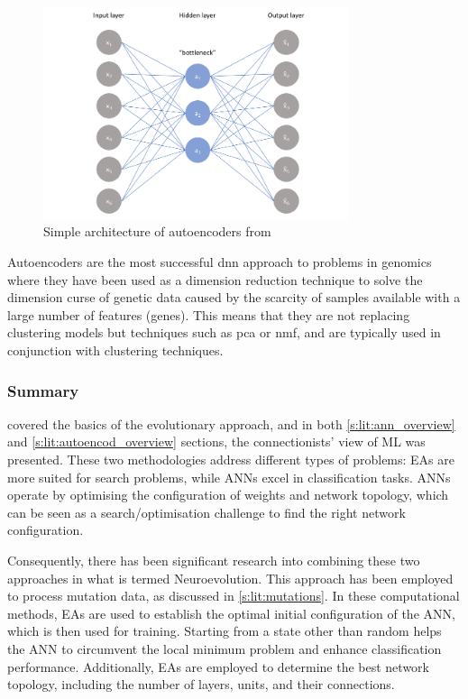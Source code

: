 \begin{figure}[!htb]
  \centering\includegraphics[width=0.8\textwidth,height=0.5\textheight,keepaspectratio]{Sections/Lit_review/Resources/simple_autoencoders.png}
    \caption{Simple architecture of autoencoders from \cite{Jordan2018-bc}}
    \label{fig:autoencoders}
\end{figure}
\FloatBarrier

Autoencoders are the most successful \acrshort{dnn} approach to problems in genomics where they have been used as a dimension reduction technique to solve the dimension curse of genetic data caused by the scarcity of samples available with a large number of features (genes). This means that they are not replacing clustering models but techniques such as \acrfull{pca} or \acrfull{nmf}, and are typically used in conjunction with clustering techniques.


\subsubsection{Summary} \label{s:lit:choosing_ml}

 covered the basics of the evolutionary approach, and in both \ref{s:lit:ann_overview} and \ref{s:lit:autoencod_overview} sections, the connectionists' view of ML was presented. These two methodologies address different types of problems: EAs are more suited for search problems, while ANNs excel in classification tasks. ANNs operate by optimising the configuration of weights and network topology, which can be seen as a search/optimisation challenge to find the right network configuration. 

Consequently, there has been significant research into combining these two approaches in what is termed Neuroevolution. This approach has been employed to process mutation data, as discussed in \cref{s:lit:mutations}. In these computational methods, EAs are used to establish the optimal initial configuration of the ANN, which is then used for training. Starting from a state other than random helps the ANN to circumvent the local minimum problem and enhance classification performance. Additionally, EAs are employed to determine the best network topology, including the number of layers, units, and their connections.

